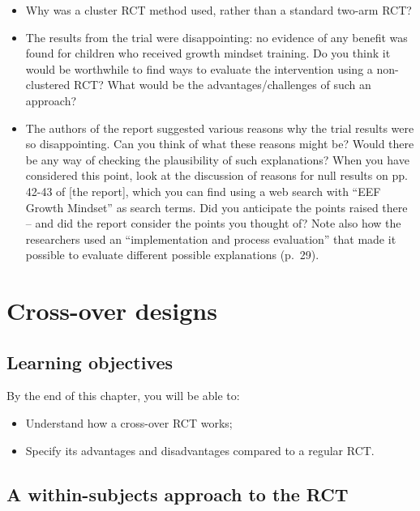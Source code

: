 \documentclass{krantz}
\providecommand{\tightlist}{%
\setlength{\itemsep}{0pt}\setlength{\parskip}{0pt}}
\begin{document}
\begin{itemize}
\item
  Why was a cluster RCT method used, rather than a standard two-arm RCT?
\item
  The results from the trial were disappointing: no evidence of any benefit was found for children who received growth mindset training. Do you think it would be worthwhile to find ways to evaluate the intervention using a non-clustered RCT? What would be the advantages/challenges of such an approach?
\item
  The authors of the report suggested various reasons why the trial results were so disappointing. Can you think of what these reasons might be? Would there be any way of checking the plausibility of such explanations? When you have considered this point, look at the discussion of reasons for null results on pp. 42-43 of {[}the report{]}, which you can find using a web search with ``EEF Growth Mindset'' as search terms. Did you anticipate the points raised there -- and did the report consider the points you thought of? Note also how the researchers used an ``implementation and process evaluation'' that made it possible to evaluate different possible explanations (p.~29).
\end{itemize}

\hypertarget{crossover}{%
\chapter{Cross-over designs}\label{crossover}}

\hypertarget{learning-objectives-17}{%
\section{Learning objectives}\label{learning-objectives-17}}

By the end of this chapter, you will be able to:

\begin{itemize}
\tightlist
\item
  Understand how a cross-over RCT works;
\item
  Specify its advantages and disadvantages compared to a regular RCT.
\end{itemize}

\hypertarget{a-within-subjects-approach-to-the-rct}{%
\section{A within-subjects approach to the RCT}\label{a-within-subjects-approach-to-the-rct}}
\end{document}
